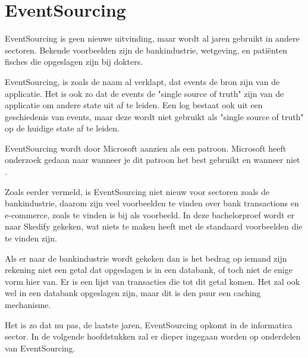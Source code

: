 
\chapter{EventSourcing}
\label{ch:eventsourcing}

EventSourcing is geen nieuwe uitvinding, maar wordt al jaren gebruikt in andere sectoren. Bekende voorbeelden zijn de bankindustrie, wetgeving, en patiënten fisches die opgeslagen zijn bij dokters.

EventSourcing, is zoals de naam al verklapt, dat events de bron zijn van de applicatie. Het is ook zo dat de events de "single source of truth" zijn van de applicatie om andere state uit af te leiden. Een log bestaat ook uit een geschiedenis van events, maar deze wordt niet gebruikt als "single source of truth" op de huidige state af te leiden.

EventSourcing wordt door Microsoft aanzien als een patroon. Microsoft heeft onderzoek gedaan naar wanneer je dit patroon het best gebruikt en wanneer niet \autocite{Microsoft2017ES}.

Zoals eerder vermeld, is EventSourcing niet nieuw voor sectoren zoals de bankindustrie, daarom zijn veel voorbeelden te vinden over bank transactions en e-commerce, zoals te vinden is bij \textcite{Microsoft2017ES} als voorbeeld. In deze bachelorproef wordt er naar Skedify gekeken, wat niets te maken heeft met de standaard voorbeelden die te vinden zijn.

Als er naar de bankindustrie wordt gekeken dan is het bedrag op iemand zijn rekening niet een getal dat opgeslagen is in een databank, of toch niet de enige vorm hier van. Er is een lijst van transacties die tot dit getal komen. Het zal ook wel in een databank opgeslagen zijn, maar dit is den puur een caching mechanisme.

Het is zo dat nu pas, de laatste jaren, EventSourcing opkomt in de informatica sector. In de volgende hoofdstukken zal er dieper ingegaan worden op onderdelen van EventSourcing.